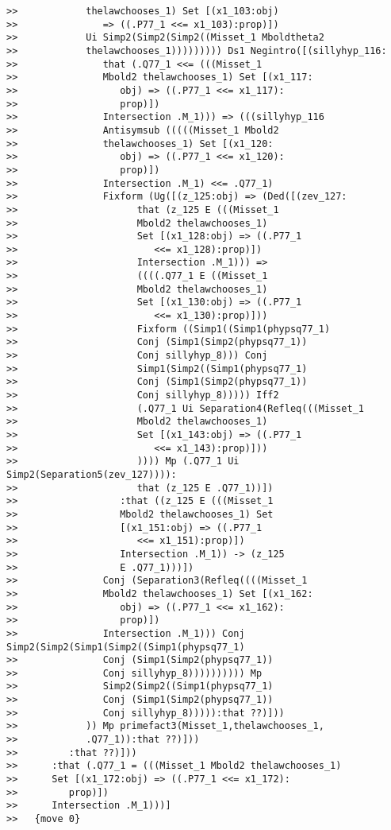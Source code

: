 \documentclass[12pt]{article}
\begin{document}
\begin{verbatim}
>>            thelawchooses_1) Set [(x1_103:obj)
>>               => ((.P77_1 <<= x1_103):prop)])
>>            Ui Simp2(Simp2(Simp2((Misset_1 Mboldtheta2
>>            thelawchooses_1))))))))) Ds1 Negintro([(sillyhyp_116:
>>               that (.Q77_1 <<= (((Misset_1
>>               Mbold2 thelawchooses_1) Set [(x1_117:
>>                  obj) => ((.P77_1 <<= x1_117):
>>                  prop)])
>>               Intersection .M_1))) => (((sillyhyp_116
>>               Antisymsub (((((Misset_1 Mbold2
>>               thelawchooses_1) Set [(x1_120:
>>                  obj) => ((.P77_1 <<= x1_120):
>>                  prop)])
>>               Intersection .M_1) <<= .Q77_1)
>>               Fixform (Ug([(z_125:obj) => (Ded([(zev_127:
>>                     that (z_125 E (((Misset_1
>>                     Mbold2 thelawchooses_1)
>>                     Set [(x1_128:obj) => ((.P77_1
>>                        <<= x1_128):prop)])
>>                     Intersection .M_1))) =>
>>                     ((((.Q77_1 E ((Misset_1
>>                     Mbold2 thelawchooses_1)
>>                     Set [(x1_130:obj) => ((.P77_1
>>                        <<= x1_130):prop)]))
>>                     Fixform ((Simp1((Simp1(phypsq77_1)
>>                     Conj (Simp1(Simp2(phypsq77_1))
>>                     Conj sillyhyp_8))) Conj
>>                     Simp1(Simp2((Simp1(phypsq77_1)
>>                     Conj (Simp1(Simp2(phypsq77_1))
>>                     Conj sillyhyp_8))))) Iff2
>>                     (.Q77_1 Ui Separation4(Refleq(((Misset_1
>>                     Mbold2 thelawchooses_1)
>>                     Set [(x1_143:obj) => ((.P77_1
>>                        <<= x1_143):prop)]))
>>                     )))) Mp (.Q77_1 Ui Simp2(Separation5(zev_127)))):
>>                     that (z_125 E .Q77_1))])
>>                  :that ((z_125 E (((Misset_1
>>                  Mbold2 thelawchooses_1) Set
>>                  [(x1_151:obj) => ((.P77_1
>>                     <<= x1_151):prop)])
>>                  Intersection .M_1)) -> (z_125
>>                  E .Q77_1)))])
>>               Conj (Separation3(Refleq((((Misset_1
>>               Mbold2 thelawchooses_1) Set [(x1_162:
>>                  obj) => ((.P77_1 <<= x1_162):
>>                  prop)])
>>               Intersection .M_1))) Conj Simp2(Simp2(Simp1(Simp2((Simp1(phypsq77_1)
>>               Conj (Simp1(Simp2(phypsq77_1))
>>               Conj sillyhyp_8)))))))))) Mp
>>               Simp2(Simp2((Simp1(phypsq77_1)
>>               Conj (Simp1(Simp2(phypsq77_1))
>>               Conj sillyhyp_8))))):that ??)]))
>>            )) Mp primefact3(Misset_1,thelawchooses_1,
>>            .Q77_1)):that ??)]))
>>         :that ??)]))
>>      :that (.Q77_1 = (((Misset_1 Mbold2 thelawchooses_1)
>>      Set [(x1_172:obj) => ((.P77_1 <<= x1_172):
>>         prop)])
>>      Intersection .M_1)))]
>>   {move 0}




\end{verbatim}
\end{document}
